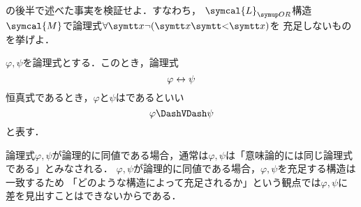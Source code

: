 
\begin{Que} \label{Que:validformula}
	の後半で述べた事実を検証せよ．すなわち，
	\(\symcal{L}_{\OrderedRing}\)構造\(\symcal{M}\)で論理式\(\forall \obj{x} \lnot \paren{\obj{x} \obj{<} \obj{x}}\)を
	充足しないものを挙げよ．
\end{Que}



\begin{Def} \label{Def:equivalentformula}
	\(\varphi, \psi\)を論理式とする．このとき，論理式
	\[
		\varphi \leftrightarrow \psi
	\]
	恒真式であるとき，\(\varphi\)と\(\psi\)はであるといい
	\begin{equation}
		\varphi \logicallyequivalent \psi
		\label{eq:logicallyequivalent}
	\end{equation}
	と表す．
\end{Def}

\begin{Note}
	論理式\(\varphi, \psi\)が論理的に同値である場合，通常は\(\varphi, \psi\)は「意味論的には同じ論理式である」とみなされる．
	\(\varphi, \psi\)が論理的に同値である場合，\(\varphi, \psi\)を充足する構造は一致するため
	「どのような構造によって充足されるか」という観点では\(\varphi, \psi\)に差を見出すことはできないからである．
\end{Note}


